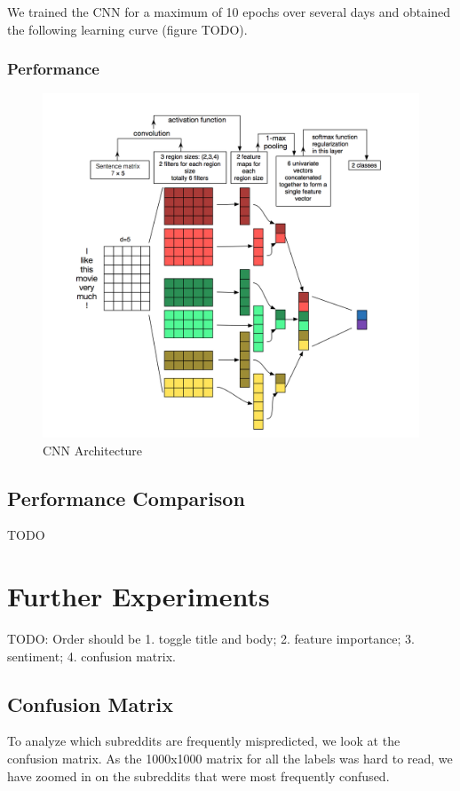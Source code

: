 \documentclass{sig-alternate-05-2015}
\begin{document}
We trained the CNN for a maximum of 10 epochs over several days and obtained the following learning curve (figure TODO).

\subsubsection{Performance}
\begin{figure}[H]
\centering
\includegraphics[width=\linewidth]{plots/multi-channel-CNN-architecture.png}
\caption{CNN Architecture}
\end{figure}

\subsection{Performance Comparison}
TODO

\section{Further Experiments}

TODO: Order should be 1. toggle title and body; 2. feature importance; 3. sentiment; 4. confusion matrix.

\subsection{Confusion Matrix}

To analyze which subreddits are frequently mispredicted, we look at the confusion matrix. As the 1000x1000 matrix for all the labels was hard to read, we have zoomed in on the subreddits that were most frequently confused.
\end{document}
